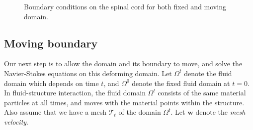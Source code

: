 \documentclass[a4paper,11pt,oneside]{book}
\newcommand{\mesh}{\mathcal{T}_t}
\begin{document}
\begin{figure}[h!]
\centering
{}
\caption{Boundary conditions on the spinal cord for both fixed and moving domain.}
\label{img:cns:4}
\end{figure}


\newpage


\subsection{Moving boundary}
Our next step is to allow the domain and its boundary to move, and
solve the Navier-Stokes equations on this deforming domain. Let $\Omega^t$ denote the fluid domain which depends on time $t$, and
$\Omega^0$ denote the fixed fluid domain at $t = 0$. In
fluid-structure interaction, the fluid domain $\Omega^t$ consists of
the same material particles at all times, and moves with the material
points within the structure. Also assume that we have a mesh $\mesh$
of the domain $\Omega^t$. Let $\mathbf{w}$ denote the \emph{mesh velocity}.
  

\end{document}
